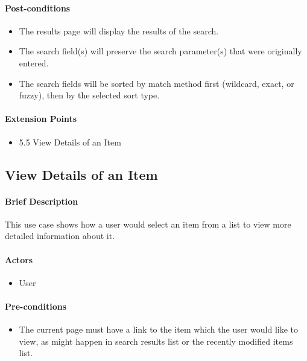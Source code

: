 \documentclass{article}
\begin{document}
\paragraph{Post-conditions}
\begin{itemize}
\item The results page will display the results of the search.
\item The search field(s) will preserve the search parameter(s) that were originally entered.
\item The search fields will be sorted by match method first (wildcard, exact, or fuzzy), then by the selected sort type.
\end{itemize}

\paragraph{Extension Points}
\begin{itemize}
\item 5.5 View Details of an Item
\end{itemize}


\subsection{View Details of an Item}
\paragraph{Brief Description}
This use case shows how a user would select an item from a list to view more detailed information about it.

\paragraph{Actors}
\begin{itemize}
\item User
\end{itemize}

\paragraph{Pre-conditions}
\begin{itemize}
\item The current page must have a link to the item which the user would like to view, as might happen in search results list or the recently modified items list.
\end{itemize}
\end{document}
